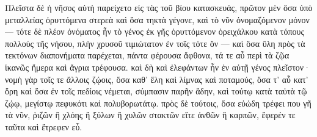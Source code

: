 {\large
\begin{greek}
\noindent Πλεῖστα δὲ ἡ νῆσος αὐτὴ παρείχετο εἰς τὰς τοῦ βίου κατασκευάς, πρῶτον μὲν ὅσα ὑπὸ μεταλλείας ὀρυττόμενα στερεὰ καὶ ὅσα τηκτὰ γέγονε, καὶ τὸ νῦν ὀνομαζόμενον μόνον — τότε δὲ πλέον ὀνόματος ἦν τὸ γένος ἐκ γῆς ὀρυττόμενον ὀρειχάλκου κατὰ τόπους πολλοὺς τῆς νήσου, πλὴν χρυσοῦ τιμιώτατον ἐν τοῖς τότε ὄν — καὶ ὅσα ὕλη πρὸς τὰ τεκτόνων διαπονήματα παρέχεται, πάντα φέρουσα ἄφθονα, τά τε αὖ περὶ τὰ ζῷα ἱκανῶς ἥμερα καὶ ἄγρια τρέφουσα. καὶ δὴ καὶ ἐλεφάντων ἦν ἐν αὐτῇ γένος πλεῖστον· νομὴ γὰρ τοῖς τε ἄλλοις ζῴοις, ὅσα καθ' ἕλη καὶ λίμνας καὶ ποταμούς, ὅσα τ' αὖ κατ' ὄρη καὶ ὅσα ἐν τοῖς πεδίοις νέμεται, σύμπασιν παρῆν ἅδην, καὶ τούτῳ κατὰ ταὐτὰ τῷ ζῴῳ, μεγίστῳ πεφυκότι καὶ πολυβορωτάτῳ. πρὸς δὲ τούτοις, ὅσα εὐώδη τρέφει που γῆ τὰ νῦν, ῥιζῶν ἢ χλόης ἢ ξύλων ἢ χυλῶν στακτῶν εἴτε ἀνθῶν ἢ καρπῶν, ἔφερέν τε ταῦτα καὶ ἔτρεφεν εὖ.
\end{greek}

}

